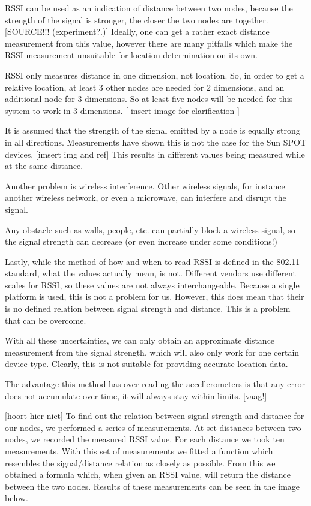 \documentclass[twoside, 11pt]{uva-bachelor-thesis}
\begin{document}
RSSI can be used as an indication of distance between two nodes, because the strength of the signal is stronger, the closer the two nodes are together. [SOURCE!!! (experiment?.)] Ideally, one can get a rather exact distance measurement from this value, however there are many pitfalls which make the RSSI measurement unsuitable for location determination on its own.

RSSI only measures distance in one dimension, not location. So, in order to get a relative location, at least 3 other nodes are needed for 2 dimensions, and an additional node for 3 dimensions. So at least five nodes will be needed for this system to work in 3 dimensions.
  [ insert image for clarification ]
  
It is assumed that the strength of the signal emitted by a node is equally strong in all directions. Measurements have shown this is not the case for the Sun SPOT devices.  [imsert img and ref] This results in different values being measured while at the same distance.

Another problem is wireless interference. Other wireless signals, for instance another wireless network, or even a microwave, can interfere and disrupt the signal.

Any obstacle such as walls, people, etc. can partially block a wireless signal, so the signal strength can decrease (or even increase under some conditions!)

Lastly, while the method of how and when to read RSSI is defined in the 802.11 standard, what the values actually mean, is not. Different vendors use different scales for RSSI, so these values are not always interchangeable. Because a single platform is used, this is not a problem for us. However, this does mean that their is no defined relation between signal strength and distance. This is a problem that can be overcome.

With all these uncertainties, we can only obtain an approximate distance measurement from the signal strength, which will also only work for one certain device type. Clearly, this is not suitable for providing accurate location data. 

The advantage this method has over reading the accellerometers is that any error does not accumulate over time, it will always stay within limits. [vaag!]


[hoort hier niet]
To find out the relation between signal strength and distance for our nodes, we performed a series of measurements. At set distances between two nodes, we recorded the measured RSSI value. For each distance we took ten measurements. With this set of measurements we fitted a function which resembles the signal/distance relation as closely as possible. From this we obtained a formula which, when given an RSSI value, will return the distance between the two nodes. Results of these measurements can be seen in the image below.
\end{document}
